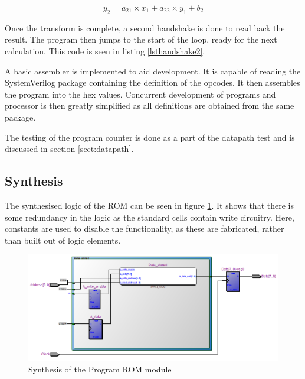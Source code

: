 \begin{equation}\label{eq:y2}
y_2 = a_{21} \times x_1 + a_{22} \times y_1 + b_2
\end{equation}





Once the transform is complete, a second handshake is done to read back the result. 
The program then jumps to the start of the loop, ready for the next calculation. 
This code is seen in listing \ref{lsthandshake2}.




A basic assembler is implemented to aid development.
It is capable of reading the SystemVerilog package containing the definition of the opcodes.
It then assembles the program into the hex values. 
Concurrent development of programs and processor is then greatly simplified as all definitions are obtained from the same package.


The testing of the program counter is done as a part of the datapath test and is discussed in section \ref{sect:datapath}.
\subsection{Synthesis}

The synthesised logic of the ROM can be seen in figure \ref{fig:ramsynth}.
It shows that there is some redundancy in the logic as the standard cells contain write circuitry.
Here, constants are used to disable the functionality, as these are fabricated, rather than built out of logic elements.


\begin{figure}
\includegraphics[width=\textwidth]{Figures/ramsynth.png}
\caption{Synthesis of the Program ROM module}
\label{fig:ramsynth}
\end{figure}
